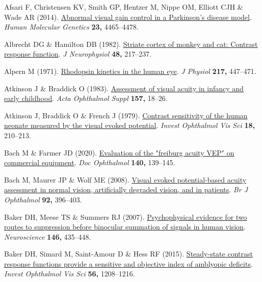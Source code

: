 \documentclass[
  letterpaper,
  DIV=11,
  numbers=noendperiod]{scrartcl}
\newlength{\cslhangindent}
\newenvironment{CSLReferences}[2] %
 {\begin{list}{}{%
  \setlength{\itemindent}{0pt}
  \setlength{\leftmargin}{0pt}
  \setlength{\parsep}{0pt}
  \ifodd #1
   \setlength{\leftmargin}{\cslhangindent}
   \setlength{\itemindent}{-1\cslhangindent}
  \fi
  \setlength{\itemsep}{#2\baselineskip}}}
 {\end{list}}
\begin{document}
\label{refs}
\begin{CSLReferences}{1}{1}
Afsari F, Christensen KV, Smith GP, Hentzer M, Nippe OM, Elliott CJH \&
Wade AR (2014). \href{https://doi.org/10.1093/hmg/ddu159}{Abnormal
visual gain control in a {Parkinson}'s disease model}. \emph{Human
Molecular Genetics} \textbf{23,} 4465--4478.

Albrecht DG \& Hamilton DB (1982).
\href{https://doi.org/10.1152/jn.1982.48.1.217}{Striate cortex of monkey
and cat: Contrast response function}. \emph{J Neurophysiol} \textbf{48,}
217--237.

Alpern M (1971).
\href{https://doi.org/10.1113/jphysiol.1971.sp009580}{Rhodopsin kinetics
in the human eye}. \emph{J Physiol} \textbf{217,} 447--471.

Atkinson J \& Braddick O (1983).
\href{https://doi.org/10.1111/j.1755-3768.1983.tb03927.x}{Assessment of
visual acuity in infancy and early childhood}. \emph{Acta Ophthalmol
Suppl} \textbf{157,} 18--26.

Atkinson J, Braddick O \& French J (1979).
\href{https://www.ncbi.nlm.nih.gov/pubmed/761974}{Contrast sensitivity
of the human neonate measured by the visual evoked potential}.
\emph{Invest Ophthalmol Vis Sci} \textbf{18,} 210--213.

Bach M \& Farmer JD (2020).
\href{https://doi.org/10.1007/s10633-019-09726-2}{Evaluation of the
"freiburg acuity VEP" on commercial equipment}. \emph{Doc Ophthalmol}
\textbf{140,} 139--145.

Bach M, Maurer JP \& Wolf ME (2008).
\href{https://doi.org/10.1136/bjo.2007.130245}{Visual evoked
potential-based acuity assessment in normal vision, artificially
degraded vision, and in patients}. \emph{Br J Ophthalmol} \textbf{92,}
396--403.

Baker DH, Meese TS \& Summers RJ (2007).
\href{https://doi.org/10.1016/j.neuroscience.2007.01.030}{Psychophysical
evidence for two routes to suppression before binocular summation of
signals in human vision}. \emph{Neuroscience} \textbf{146,} 435--448.

Baker DH, Simard M, Saint-Amour D \& Hess RF (2015).
\href{https://doi.org/10.1167/iovs.14-15611}{Steady-state contrast
response functions provide a sensitive and objective index of amblyopic
deficits}. \emph{Invest Ophthalmol Vis Sci} \textbf{56,} 1208--1216.


\end{CSLReferences}
\end{document}
